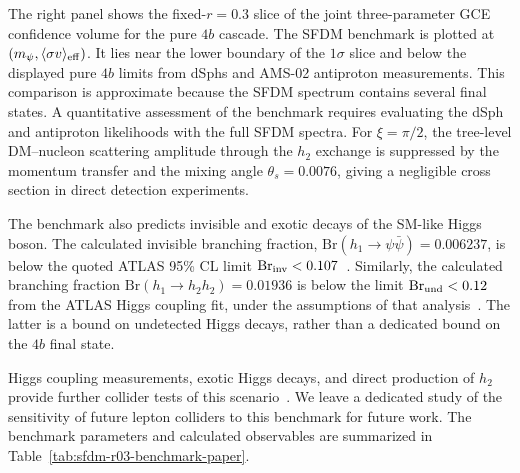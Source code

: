 \documentclass[superscriptaddress,
showpacs,preprintnumbers,nofootinbib,eqsecnum,amsmath,amssymb,aps,11pt, groupedaddress, floatfix]{revtex4-2}
\begin{document}
The right panel shows the fixed-$r=0.3$ slice of the joint three-parameter GCE confidence volume for the pure $4b$ cascade.
The SFDM benchmark is plotted at
$(m_\psi,\langle\sigma v\rangle_{\rm eff})$.
It lies near the lower boundary of the $1\sigma$ slice and below the displayed pure $4b$ limits from dSphs
and AMS-02 antiproton measurements.
This comparison is approximate because the SFDM spectrum contains several final states.
A quantitative assessment of the benchmark requires evaluating the dSph and antiproton likelihoods with
the full SFDM spectra.
For $\xi=\pi/2$, the tree-level DM--nucleon scattering amplitude through the $h_2$ exchange is suppressed by the momentum transfer and the mixing angle $\theta_s = 0.0076$, giving a negligible cross section in direct detection experiments. 


The benchmark also predicts invisible and exotic decays
of the SM-like Higgs boson.
The calculated invisible branching fraction, $\mathrm{Br}(h_1 \to \psi \bar \psi)=0.006237$,
is below the quoted ATLAS 95\% CL limit $\mathrm{Br}_{\rm inv} < 0.107$~\cite{ATLAS:2023tkt}.
Similarly, the calculated branching fraction $\mathrm{Br}(h_1 \to h_2 h_2)=0.01936$ is below the limit
$\mathrm{Br}_{\rm und}<0.12$ from the ATLAS Higgs coupling fit, under the assumptions of that analysis~\cite{ATLAS:2022vkf}.
The latter is a bound on undetected Higgs decays, rather than a dedicated bound on the $4b$ final state.

Higgs coupling measurements, exotic Higgs decays, and direct production of $h_2$ provide further collider
tests of this scenario~\cite{Kim:2018uov}.
We leave a dedicated study of the sensitivity of future lepton colliders to this benchmark for future work.
The benchmark parameters and calculated observables are summarized in Table~\ref{tab:sfdm-r03-benchmark-paper}.
\end{document}
